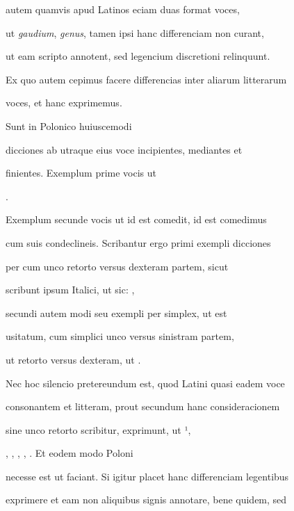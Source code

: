 \indentK {} autem quamvis apud Latinos eciam duas format voces,

ut \textit{gaudium}, \textit{genus}, tamen ipsi hanc differenciam non curant,

ut eam scripto annotent, sed legencium discretioni relinquunt.

Ex quo autem cepimus facere differencias inter aliarum litterarum

\splitlines

voces, et hanc exprimemus.

\indentK Sunt in Polonico huiuscemodi

\fulllines

dicciones ab utraque eius voce incipientes, mediantes et

finientes. Exemplum prime vocis ut   

      .

Exemplum secunde vocis ut  id est comedit,  id est comedimus

cum suis condeclineis. Scribantur ergo primi exempli dicciones

per  cum unco retorto versus dexteram partem, sicut

scribunt ipsum Italici, ut sic:   ,

secundi autem modi seu exempli per  simplex, ut est

usitatum, cum simplici unco versus sinistram partem,

ut retorto versus dexteram, ut   .

\indentK Nec hoc silencio pretereundum est, quod Latini quasi eadem voce

 consonantem et  litteram, prout secundum hanc consideracionem

sine unco retorto scribitur, exprimunt, ut ¹,

, , , , . Et eodem modo Poloni

necesse est ut faciant. Si igitur placet hanc differenciam legentibus

exprimere et eam non aliquibus signis annotare, bene quidem, sed

